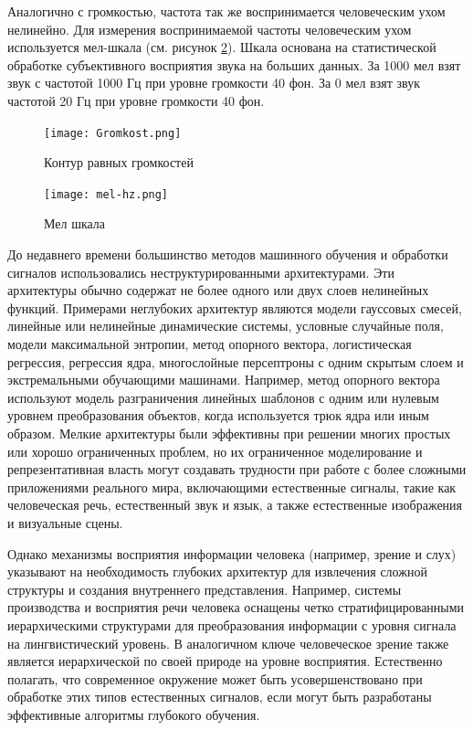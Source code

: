 Аналогично с громкостью, частота так же воспринимается человеческим ухом нелинейно. Для измерения воспринимаемой частоты человеческим ухом используется мел-шкала (см. рисунок \ref{sec:analysus:mel}). Шкала основана на статистической обработке субъективного восприятия звука на больших данных. За 1000 мел взят звук с частотой 1000 Гц при уровне громкости 40 фон. За 0 мел взят звук частотой 20 Гц при уровне громкости 40 фон.

\begin{figure}[h]
\centering
	\texttt{[image: Gromkost.png]}
	\caption{Контур равных громкостей}
	\label{sec:analysus:sound_contur}
\end{figure}

\begin{figure}[h]
\centering
	\texttt{[image: mel-hz.png]}
	\caption{Мел шкала}
	\label{sec:analysus:mel}
\end{figure}

До недавнего времени большинство методов машинного обучения и обработки сигналов использовались неструктурированными архитектурами. Эти архитектуры обычно содержат не более одного или двух слоев нелинейных функций. Примерами неглубоких архитектур являются модели гауссовых смесей, линейные или нелинейные динамические системы, условные случайные поля, модели максимальной энтропии, метод опорного вектора, логистическая регрессия, регрессия ядра, многослойные персептроны с одним скрытым слоем и экстремальными обучающими машинами. Например, метод опорного вектора используют модель разграничения линейных шаблонов с одним или нулевым уровнем преобразования объектов, когда используется трюк ядра или иным образом. Мелкие архитектуры были эффективны при решении многих простых или хорошо ограниченных проблем, но их ограниченное моделирование и репрезентативная власть могут создавать трудности при работе с более сложными приложениями реального мира, включающими естественные сигналы, такие как человеческая речь, естественный звук и язык, а также естественные изображения и визуальные сцены.

Однако механизмы восприятия информации человека (например, зрение и слух) указывают на необходимость глубоких архитектур для извлечения сложной структуры и создания внутреннего представления. Например, системы производства и восприятия речи человека оснащены четко стратифицированными иерархическими структурами для преобразования информации с уровня сигнала на лингвистический уровень. В аналогичном ключе человеческое зрение также является иерархической по своей природе на уровне восприятия. Естественно полагать, что современное окружение может быть усовершенствовано при обработке этих типов естественных сигналов, если могут быть разработаны эффективные алгоритмы глубокого обучения.

